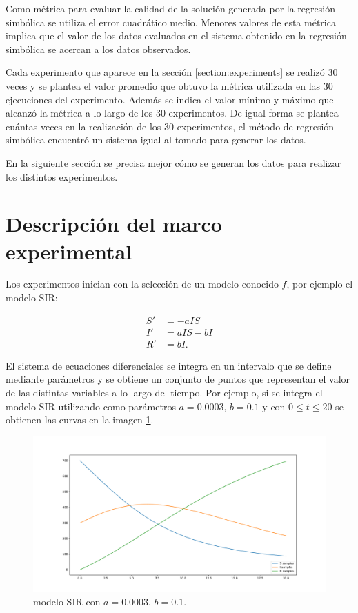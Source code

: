 Como métrica para evaluar la calidad de la solución generada por la regresión simbólica se utiliza el error cuadrático medio. Menores valores de esta métrica implica que el valor de los datos evaluados en el sistema obtenido en la regresión simbólica se acercan a los datos observados.

Cada experimento que aparece en la sección \ref{section:experiments} se realizó 30 veces y se plantea el valor promedio que obtuvo la métrica utilizada en las 30 ejecuciones del experimento. Además se indica el valor mínimo y máximo que alcanzó la métrica a lo largo de los 30 experimentos. De igual forma se plantea cuántas veces en la realización de los 30 experimentos, el método de regresión simbólica encuentró un sistema igual al tomado para generar los datos.

En la siguiente sección se precisa mejor cómo se generan los datos para realizar los distintos experimentos.

\section{Descripción del marco experimental}\label{section:experimental_frame}

Los experimentos inician con la selección de un modelo conocido $f$, por ejemplo el modelo SIR:

\begin{align*}
    S' & = - aIS    \\
    I' & = aIS - bI \\
    R' & = bI.
\end{align*}

El sistema de ecuaciones diferenciales se integra en un intervalo que se define mediante parámetros y se obtiene un conjunto de puntos que representan el valor de las distintas variables a lo largo del tiempo. Por ejemplo, si se integra el modelo SIR utilizando como parámetros $a = 0.0003$, $b = 0.1$ y con $0 \leq t \leq 20$ se obtienen las curvas en la imagen \ref{fig:SIR}.

\begin{figure}[h]
    \centering
    \includegraphics[width=\textwidth]{"figures/SIR.pdf"}
    \caption{modelo SIR con $a = 0.0003$, $b = 0.1$.}
    \label{fig:SIR}
\end{figure}

